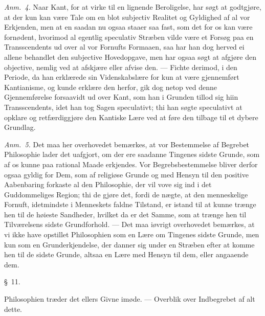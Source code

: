 \documentclass[12pt,a4paper]{book}
\newcommand{\apage}[1]{\marginnote{\footnotesize\textit{[#1]}}}
\begin{document}
{\small\emph{Anm.~4.} Naar Kant, for at virke til en lignende Beroligelse, har
søgt at godtgjøre, at der kun kan være Tale om en blot subjectiv Realitet og
Gyldighed af al vor Erkjenden, men at en saadan nu ogsaa staaer saa fast, som det
for os kan være fornødent, hvorimod al egentlig speculativ Stræben vilde være et
Forsøg paa en Transscendents ud over al vor Fornufts Formaaen, saa har han
dog herved ei allene behandlet den subjective Hovedopgave, men har ogsaa søgt at
afgjøre den objective, nemlig ved at afskjære eller afvise den. --- Fichte derimod,
i den Periode, da han erklærede sin Videnskabslære for kun at være gjennemført
Kantianisme, og kunde erklære den herfor, gik dog netop ved denne Gjennemførelse
forsaavidt ud over Kant, som han i Grunden tillod sig hiin Transscendents, idet
han tog Sagen speculativt; thi han søgte speculativt at opklare og retfærdiggjøre
den Kantiske Lære ved at føre den tilbage til et dybere Grundlag.\par}
  \apage{33}
{\small

\emph{Anm.~5.} Det maa her overhovedet bemærkes, at vor Bestemmelse af
Begrebet Philosophie lader det uafgjort, om der ere saadanne Tingenes sidste
Grunde, som af os kunne paa rational Maade erkjendes. Vor Begrebsbestemmelse
bliver derfor ogsaa gyldig for Dem, som af religiøse Grunde og med Hensyn til den
positive Aabenbaring forkaste al den Philosophie, der vil vove sig ind i det
Guddommeliges Region; thi de gjøre det, fordi de nægte, at den menneskelige
Fornuft, idetmindste i Menneskets faldne Tilstand, er istand til at kunne trænge
hen til de høieste Sandheder, hvilket da er det Samme, som at trænge hen til
Tilværelsens sidste Grundforhold. --- Det maa iøvrigt overhovedet bemærkes, at vi
ikke have opstillet Philosophien som en Lære om Tingenes sidste Grunde, men kun
som en Grunderkjendelse, der danner sig under en Stræben efter at komme hen til de
sidste Grunde, altsaa en Lære med Hensyn til dem, eller angaaende dem.\par}

\begin{center}\large\S~11.\end{center}
\begin{center}Philosophien træder det ellers Givne imøde. --- Overblik over
Indbegrebet af alt dette.\end{center}
\end{document}
